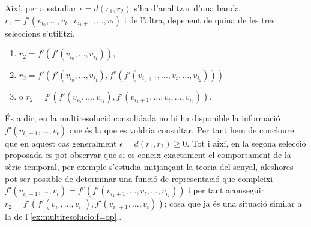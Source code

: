    Així, per a estudiar $\epsilon=d(r_1,r_2)$ s'ha d'analitzar d'una
   banda $r_1=f'(v_{i_0},\dotsc,v_{i_1},v_{i_1+1},\dotsc,v_{t})$ i de l'altra, depenent de quina de les
   tres seleccions s'utilitzi,
   \begin{enumerate}
   \item $r_2=f'(f'(v_{i_0},\dotsc,v_{i_1}))$, 

   \item
     $r_2=f'(f'(v_{i_0},\dotsc,v_{i_1}),f^r(f'(v_{i_1+1},\dotsc,v_{t},\dotsc,v_{i_2})))$
     \item o $r_2=f'(f'(v_{i_0},\dotsc,v_{i_1}),f'(v_{i_1+1},\dotsc,v_{t},\dotsc,v_{i_2}))$.
\end{enumerate}

És a dir, en la multiresolució consolidada no hi ha disponible la
informació $f'(v_{i_1+1},\dotsc,v_{t})$ que és la que es voldria
consultar.  Per tant hem de concloure que en aquest cas generalment
$\epsilon=d(r_1,r_2)\geq 0$. Tot i així, en la segona selecció
proposada es pot observar que si es coneix exactament el comportament
de la sèrie temporal, per exemple s'estudia mitjançant la teoria del
senyal, aleshores pot ser possible de determinar una funció de
representació que compleixi $ f'(v_{i_1+1},\dotsc,v_{t}) =
f^r(f'(v_{i_1+1},\dotsc,v_{t},\dotsc,v_{i_2}))$ i per tant aconseguir
$r_2=f'(f'(v_{i_0},\dotsc,v_{i_1}), f'(v_{i_1+1},\dotsc,v_{t}) )$;
cosa que ja és una situació similar a la de
l'\autoref{ex:multiresolucio:f=op}..







